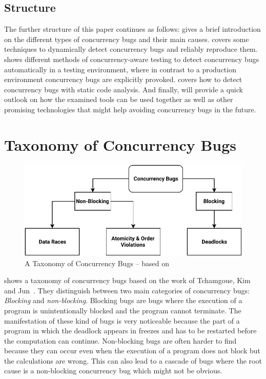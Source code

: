 \documentclass[conference]{IEEEtran}
\begin{document}
\subsection{Structure}

The further structure of this paper continues as follows:
 gives a brief introduction on the different types of concurrency bugs and their main causes.
 covers some techniques to dynamically detect concurrency bugs and reliably reproduce them.
 shows different methods of concurrency-aware testing to detect concurrency bugs automatically in a testing environment, where in contrast to a production environment concurrency bugs are explicitly provoked.
 covers how to detect concurrency bugs with static code analysis.
And finally,  will provide a quick outlook on how the examined tools can be used together as well as other promising technologies that might help avoiding concurrency bugs in the future.


\section{Taxonomy of Concurrency Bugs}
\label{sct:taxonomy}

\begin{figure}
    \includegraphics[width=\linewidth]{figures/ConcurrencyBugClasses.pdf}
    \caption{A Taxonomy of Concurrency Bugs -- based on\cite{tchamgoue2012testing}}
    \label{fig:classes}
\end{figure}

 shows a taxonomy of concurrency bugs based on the work of Tchamgoue, Kim and Jun~\cite{tchamgoue2012testing}.
They distinguish between two main categories of concurrency bugs: \emph{Blocking} and \emph{non-blocking}.
Blocking bugs are bugs where the execution of a program is unintentionally blocked and the program cannot terminate.
The manifestation of these kind of bugs is very noticeable because the part of a program in which the deadlock appears in freezes and has to be restarted before the computation can continue.
Non-blocking bugs are often harder to find because they can occur even when the execution of a program does not block but the calculations are wrong.
This can also lead to a cascade of bugs where the root cause is a non-blocking concurrency bug which might not be obvious.
\end{document}
